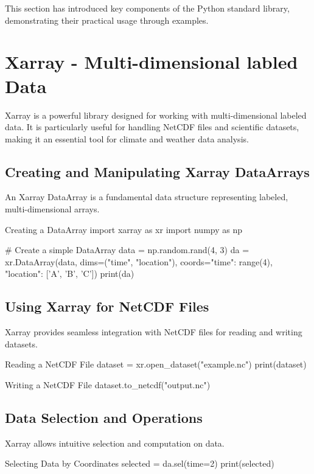 This section has introduced key components of the Python standard library, demonstrating their practical usage through examples.


\section{Xarray - Multi-dimensional labled Data}
Xarray is a powerful library designed for working with multi-dimensional labeled data. It is particularly useful for handling NetCDF files and scientific datasets, making it an essential tool for climate and weather data analysis.

\subsection{Creating and Manipulating Xarray DataArrays}
An Xarray DataArray is a fundamental data structure representing labeled, multi-dimensional arrays.

\begin{codeonly}{Creating a DataArray}
import xarray as xr
import numpy as np

# Create a simple DataArray
data = np.random.rand(4, 3)
da = xr.DataArray(data, dims=("time", "location"), coords={"time": range(4), "location": ['A', 'B', 'C']})
print(da)
\end{codeonly}

\subsection{Using Xarray for NetCDF Files}
Xarray provides seamless integration with NetCDF files for reading and writing datasets.

\begin{codeonly}{Reading a NetCDF File}
dataset = xr.open_dataset("example.nc")
print(dataset)
\end{codeonly}

\begin{codeonly}{Writing a NetCDF File}
dataset.to_netcdf("output.nc")
\end{codeonly}

\subsection{Data Selection and Operations}
Xarray allows intuitive selection and computation on data.

\begin{codeonly}{Selecting Data by Coordinates}
selected = da.sel(time=2)
print(selected)
\end{codeonly}

